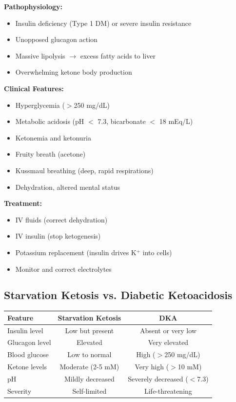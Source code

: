\begin{tcolorbox}[colback=red!5, colframe=red!70!black, title=\textbf{Clinical Correlation: Diabetic Ketoacidosis (DKA)}]
\textbf{Pathophysiology:}
\begin{itemize}
    \item Insulin deficiency (Type 1 DM) or severe insulin resistance
    \item Unopposed glucagon action
    \item Massive lipolysis $\rightarrow$ excess fatty acids to liver
    \item Overwhelming ketone body production
\end{itemize}

\textbf{Clinical Features:}
\begin{itemize}
    \item Hyperglycemia ($>$250 mg/dL)
    \item Metabolic acidosis (pH $<$ 7.3, bicarbonate $<$ 18 mEq/L)
    \item Ketonemia and ketonuria
    \item Fruity breath (acetone)
    \item Kussmaul breathing (deep, rapid respirations)
    \item Dehydration, altered mental status
\end{itemize}

\textbf{Treatment:}
\begin{itemize}
    \item IV fluids (correct dehydration)
    \item IV insulin (stop ketogenesis)
    \item Potassium replacement (insulin drives K$^+$ into cells)
    \item Monitor and correct electrolytes
\end{itemize}
\end{tcolorbox}

\subsection{Starvation Ketosis vs. Diabetic Ketoacidosis}

\begin{center}
\begin{tabular}{lcc}
\toprule
\textbf{Feature} & \textbf{Starvation Ketosis} & \textbf{DKA} \\
\midrule
Insulin level & Low but present & Absent or very low \\
Glucagon level & Elevated & Very elevated \\
Blood glucose & Low to normal & High ($>$250 mg/dL) \\
Ketone levels & Moderate (2-5 mM) & Very high ($>$10 mM) \\
pH & Mildly decreased & Severely decreased ($<$7.3) \\
Severity & Self-limited & Life-threatening \\
\bottomrule
\end{tabular}
\end{center}

